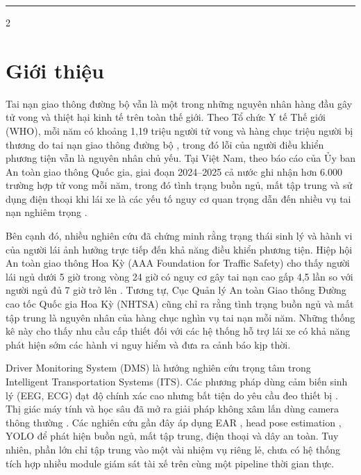 \documentclass[10pt]{article}
\begin{document}
\vspace{4pt}
\noindent\rule{\textwidth}{0.8pt}
\vspace{4pt}

\begin{multicols}{2}


\section{Giới thiệu}

Tai nạn giao thông đường bộ vẫn là một trong những nguyên nhân hàng đầu gây tử vong và thiệt hại kinh tế trên toàn thế giới. Theo Tổ chức Y tế Thế giới (WHO), mỗi năm có khoảng 1,19 triệu người tử vong và hàng chục triệu người bị thương do tai nạn giao thông đường bộ \cite{who2023}, trong đó lỗi của người điều khiển phương tiện vẫn là nguyên nhân chủ yếu. Tại Việt Nam, theo báo cáo của Ủy ban An toàn giao thông Quốc gia, giai đoạn 2024--2025 cả nước ghi nhận hơn 6.000 trường hợp tử vong mỗi năm, trong đó tình trạng buồn ngủ, mất tập trung và sử dụng điện thoại khi lái xe là các yếu tố nguy cơ quan trọng dẫn đến nhiều vụ tai nạn nghiêm trọng \cite{hien2026, baogiaothong2025}.

Bên cạnh đó, nhiều nghiên cứu đã chứng minh rằng trạng thái sinh lý và hành vi của người lái ảnh hưởng trực tiếp đến khả năng điều khiển phương tiện. Hiệp hội An toàn giao thông Hoa Kỳ (AAA Foundation for Traffic Safety) cho thấy người lái ngủ dưới 5 giờ trong vòng 24 giờ có nguy cơ gây tai nạn cao gấp 4,5 lần so với người ngủ đủ 7 giờ trở lên \cite{aaa2018}. Tương tự, Cục Quản lý An toàn Giao thông Đường cao tốc Quốc gia Hoa Kỳ (NHTSA) cũng chỉ ra rằng tình trạng buồn ngủ và mất tập trung là nguyên nhân của hàng chục nghìn vụ tai nạn mỗi năm. Những thống kê này cho thấy nhu cầu cấp thiết đối với các hệ thống hỗ trợ lái xe có khả năng phát hiện sớm các hành vi nguy hiểm và đưa ra cảnh báo kịp thời.

Driver Monitoring System (DMS) là hướng nghiên cứu trọng tâm trong Intelligent Transportation Systems (ITS). Các phương pháp dùng cảm biến sinh lý (EEG, ECG) đạt độ chính xác cao nhưng bất tiện do yêu cầu đeo thiết bị \cite{ji2002}. Thị giác máy tính và học sâu đã mở ra giải pháp không xâm lấn dùng camera thông thường \cite{voulodimos2018, lecun2015}. Các nghiên cứu gần đây áp dụng EAR \cite{soukupova2016}, head pose estimation \cite{lawson2020, malek2021}, YOLO \cite{redmon2016, jocher2023} để phát hiện buồn ngủ, mất tập trung, điện thoại và dây an toàn. Tuy nhiên, phần lớn chỉ tập trung vào một vài nhiệm vụ riêng lẻ, chưa có hệ thống tích hợp nhiều module giám sát tài xế trên cùng một pipeline thời gian thực.


\end{multicols}
\end{document}
